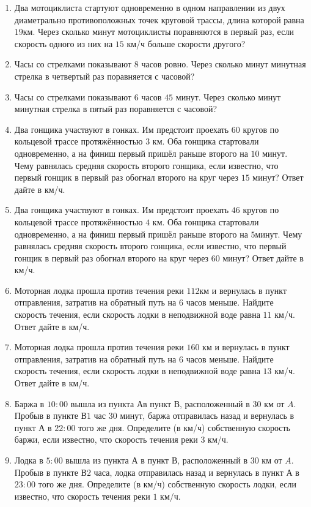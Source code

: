 \documentclass[12pt, a4paper]{article}
\begin{document}
\begin{enumerate}
		\item Два мотоциклиста стартуют одновременно в одном направлении из двух диаметрально противоположных точек круговой трассы, длина которой равна \( 19  \)км. Через сколько минут мотоциклисты поравняются в первый раз, если скорость одного из них на \( 15  \) км/ч больше скорости другого?
		\item Часы со стрелками показывают \( 8  \) часов ровно. Через сколько минут минутная стрелка в четвертый раз поравняется с часовой?
		\item Часы со стрелками показывают \( 6  \) часов \( 45  \) минут. Через сколько минут минутная стрелка в пятый раз поравняется с часовой?
		\item Два гонщика участвуют в гонках. Им предстоит проехать \(60\) кругов по кольцевой трассе протяжённостью \(3\) км. Оба гонщика стартовали одновременно, а на финиш первый пришёл раньше второго на \(10\) минут. Чему равнялась средняя скорость второго гонщика, если известно, что первый гонщик в первый раз обогнал второго на круг через \(15\) минут? Ответ дайте в км/ч.
		\item  Два гонщика участвуют в гонках. Им предстоит проехать \(46\) кругов по кольцевой трассе протяжённостью \(4\) км. Оба гонщика стартовали одновременно, а на финиш первый пришёл раньше второго на \(5\)минут. Чему равнялась средняя скорость второго гонщика, если известно, что первый гонщик в первый раз обогнал второго на круг через \(60\) минут? Ответ дайте в км/ч.
		\item Моторная лодка прошла против течения реки \( 112  \)км и вернулась в пункт отправления, затратив на обратный путь на \(6\) часов меньше. Найдите скорость течения, если скорость лодки в неподвижной воде равна \( 11  \) км/ч. Ответ дайте в км/ч.
		\item Моторная лодка прошла против течения реки \( 160  \) км и вернулась в пункт отправления, затратив на обратный путь на \( 6  \) часов меньше. Найдите скорость течения, если скорость лодки в неподвижной воде равна \( 13  \) км/ч. Ответ дайте в км/ч.
		\item Баржа в \( 10:00  \) вышла из пункта \( А  \)в пункт \( В \), расположенный в \( 30  \) км от \( A \). Пробыв в пункте \( В 1  \) час \( 30  \) минут, баржа отправилась назад и вернулась в пункт \( А  \) в \( 22:00  \) того же дня. Определите (в км/ч) собственную скорость баржи, если известно, что скорость течения реки \( 3  \) км/ч.
		\item Лодка в \( 5:00  \) вышла из пункта \( А  \) в пункт \( В \), расположенный в \( 30  \) км от \( A \). Пробыв в пункте \(  В 2  \) часа, лодка отправилась назад и вернулась в пункт \( А  \) в \( 23:00  \) того же дня. Определите (в км/ч) собственную скорость лодки, если известно, что скорость течения реки \( 1  \) км/ч.

\end{enumerate}
\end{document}
